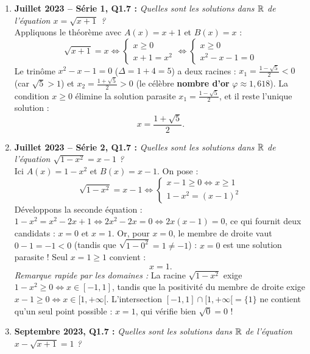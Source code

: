 \begin{exemple}
\begin{enumerate}
    \item \textbf{Juillet 2023 -- Série 1, Q1.7 :} \emph{Quelles sont les solutions dans $\mathbb{R}$ de l'équation $x = \sqrt{x + 1}$ ?}\\
    Appliquons le théorème avec $A(x) = x + 1$ et $B(x) = x$ :
    \[
        \sqrt{x + 1} = x \iff \begin{cases} x \ge 0 \\ x + 1 = x^2 \end{cases} \iff \begin{cases} x \ge 0 \\ x^2 - x - 1 = 0 \end{cases}
    \]
    Le trinôme $x^2 - x - 1 = 0$ ($\Delta = 1 + 4 = 5$) a deux racines : $x_1 = \frac{1 - \sqrt{5}}{2} < 0$ (car $\sqrt{5} > 1$) et $x_2 = \frac{1 + \sqrt{5}}{2} > 0$ (le célèbre \textbf{nombre d'or} $\varphi \approx 1,618$).
    La condition $x \ge 0$ élimine la solution parasite $x_1 = \frac{1-\sqrt{5}}{2}$, et il reste l'unique solution :
    \[
        \boxed{x = \frac{1 + \sqrt{5}}{2}}.
    \]
    \item \textbf{Juillet 2023 -- Série 2, Q1.7 :} \emph{Quelles sont les solutions dans $\mathbb{R}$ de l'équation $\sqrt{1 - x^2} = x - 1$ ?}\\
    Ici $A(x) = 1 - x^2$ et $B(x) = x - 1$. On pose :
    \[
        \sqrt{1 - x^2} = x - 1 \iff \begin{cases} x - 1 \ge 0 \iff x \ge 1 \\ 1 - x^2 = (x - 1)^2 \end{cases}
    \]
    Développons la seconde équation : $1 - x^2 = x^2 - 2x + 1 \iff 2x^2 - 2x = 0 \iff 2x(x - 1) = 0$, ce qui fournit deux candidats : $x = 0$ et $x = 1$.
    Or, pour $x = 0$, le membre de droite vaut $0 - 1 = -1 < 0$ (tandis que $\sqrt{1 - 0^2} = 1 \neq -1$) : $x = 0$ est une solution parasite ! Seul $x = 1 \ge 1$ convient :
    \[
        \boxed{x = 1}.
    \]
    \emph{Remarque rapide par les domaines :} La racine $\sqrt{1-x^2}$ exige $1-x^2 \ge 0 \iff x \in [-1, 1]$, tandis que la positivité du membre de droite exige $x - 1 \ge 0 \iff x \in [1, +\infty[$. L'intersection $[-1, 1] \cap [1, +\infty[ = \{1\}$ ne contient qu'un seul point possible : $x = 1$, qui vérifie bien $\sqrt{0} = 0$ !
    \item \textbf{Septembre 2023, Q1.7 :} \emph{Quelles sont les solutions dans $\mathbb{R}$ de l'équation $x - \sqrt{x + 1} = 1$ ?}\\

\end{enumerate}
\end{exemple}

